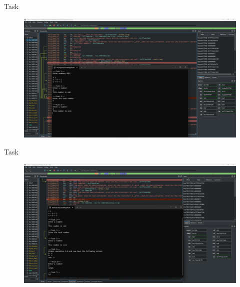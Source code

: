 \documentclass[a4paper,12pt]{article}
\newcommand{\RomanNumeralCaps}[1]{\MakeUppercase{\romannumeral #1}}
\begin{document}
\newpage
    \begin{center}
        \Large{Task \RomanNumeralCaps{6}}
    \end{center}
    \begin{figure}[h!]
        \begin{minipage}[h]{1\linewidth}
            \centering
            \includegraphics[width=1\linewidth]{Prt sc/6_1.png}  
        \end{minipage}
    \end{figure}
    \begin{center}
        \Large{Task \RomanNumeralCaps{7}}
    \end{center}
    \begin{figure}[h!]
        \begin{minipage}[h]{1\linewidth}
            \centering
            \includegraphics[width=1\linewidth]{Prt sc/7_1.png}  
        \end{minipage}
    \end{figure}
\end{document}
